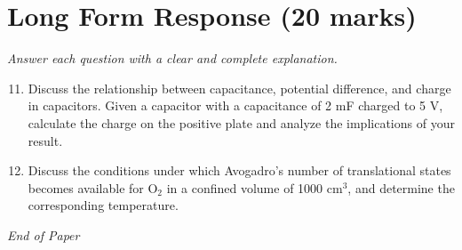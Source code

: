 \documentclass[12pt]{article}
\begin{document}
\section*{Long Form Response (20 marks)}
\textit{Answer each question with a clear and complete explanation.}
\begin{enumerate}[label=\arabic*.]
\setcounter{enumi}{10}
\item Discuss the relationship between capacitance, potential difference, and charge in capacitors. Given a capacitor with a capacitance of 2 mF charged to 5 V, calculate the charge on the positive plate and analyze the implications of your result.
\item Discuss the conditions under which Avogadro's number of translational states becomes available for $\mathrm{O}_2$ in a confined volume of 1000 $\mathrm{cm}^3$, and determine the corresponding temperature.
\end{enumerate}

\vfill
\noindent\textit{End of Paper}
\end{document}
